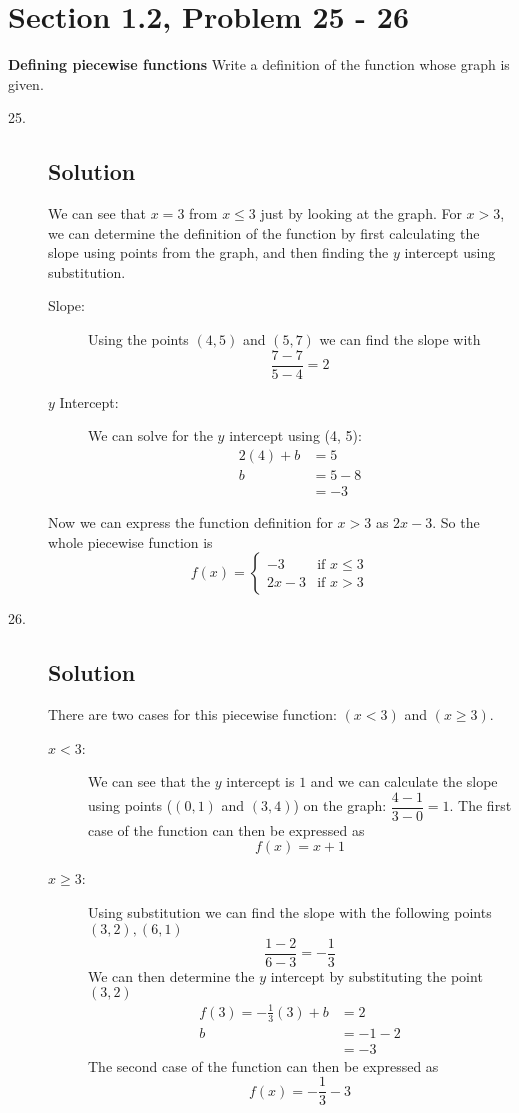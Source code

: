 \documentclass{article}
\newcommand{\problem}[2]{\vspace{5ex}\section*{Section #1, Problem #2}}
\newcommand{\solution}{\subsection*{Solution}}
\begin{document}
\problem{1.2}{25 \-- 26}
\textbf{Defining piecewise functions} Write a definition of the function whose graph is given.

\begin{description}
  \item[25.]
  \solution{}
  We can see that $x = 3$ from $x \leq 3$ just by looking at the graph. For $x > 3$, we can determine
  the definition of the function by first calculating the slope using points from the graph, and then
  finding the $y$ intercept using substitution.

  \begin{description}
    \item[Slope:] Using the points $(4, 5)$ and $(5, 7)$ we can find the slope with
    \[
      \dfrac{7-7}{5-4} = 2
    \]
    \item[$y$ Intercept:] We can solve for the $y$ intercept using (4, 5):
      \begin{align*}
        2(4) + b &= 5 \\
               b &= 5 - 8 \\
                 &= -3
      \end{align*}
  \end{description}
  Now we can express the function definition for $x > 3$ as $2x -3$. So the whole piecewise function is
  \[
    f(x) = \begin{cases}
             -3   &\text{if } x \leq 3 \\
             2x-3 &\text{if } x > 3
           \end{cases}
  \]

  \item[26.]
  \solution{}
  There are two cases for this piecewise function: $(x < 3)$ and $(x \geq 3)$.
  \begin{description}
  \item[$x<3$:] We can see that the $y$ intercept is $1$ and we can calculate the slope using points
    ($(0,1)$ and $(3,4)$) on the graph: $\dfrac{4-1}{3-0} = 1$. The first case of the function can
    then be expressed as
    \[
      f(x) = x + 1
    \]

  \item[$x\geq3$:] Using substitution we can find the slope with the following points $(3,2), (6,1)$
    \[
      \dfrac{1-2}{6-3} = -\dfrac{1}{3}
    \]
    We can then determine the $y$ intercept by substituting the point $(3,2)$
    \begin{align*}
      f(3) = -\frac{1}{3}(3) + b &= 2 \\
                               b &= -1 -2 \\
                                 &= -3
    \end{align*}
    The second case of the function can then be expressed as
    \[
      f(x) = -\frac{1}{3} -3
    \]


\end{description}
\end{description}
\end{document}
